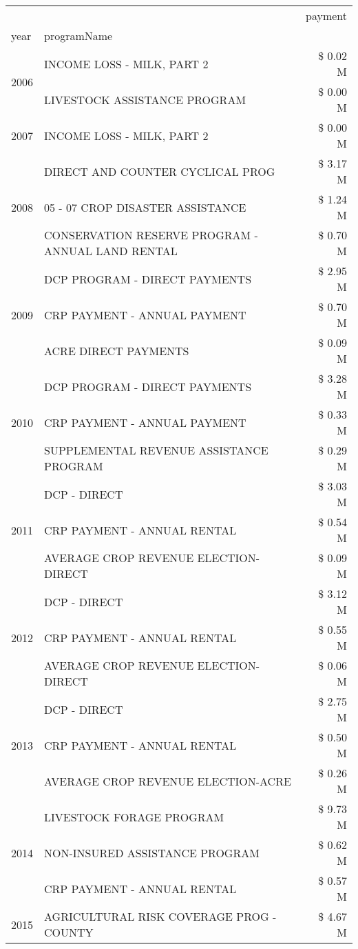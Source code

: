 \begin{tabular}{llr}
\toprule
 &  & payment \\
year & programName &  \\
\midrule
\multirow[t]{2}{*}{2006} & INCOME LOSS - MILK, PART 2 & \$ 0.02 M \\
 & LIVESTOCK ASSISTANCE PROGRAM & \$ 0.00 M \\
\cline{1-3}
2007 & INCOME LOSS - MILK, PART 2 & \$ 0.00 M \\
\cline{1-3}
\multirow[t]{3}{*}{2008} & DIRECT AND COUNTER CYCLICAL PROG & \$ 3.17 M \\
 & 05 - 07 CROP DISASTER ASSISTANCE & \$ 1.24 M \\
 & CONSERVATION RESERVE PROGRAM - ANNUAL LAND RENTAL & \$ 0.70 M \\
\cline{1-3}
\multirow[t]{3}{*}{2009} & DCP PROGRAM - DIRECT PAYMENTS & \$ 2.95 M \\
 & CRP PAYMENT - ANNUAL PAYMENT & \$ 0.70 M \\
 & ACRE DIRECT PAYMENTS & \$ 0.09 M \\
\cline{1-3}
\multirow[t]{3}{*}{2010} & DCP PROGRAM - DIRECT PAYMENTS & \$ 3.28 M \\
 & CRP PAYMENT - ANNUAL PAYMENT & \$ 0.33 M \\
 & SUPPLEMENTAL REVENUE ASSISTANCE PROGRAM & \$ 0.29 M \\
\cline{1-3}
\multirow[t]{3}{*}{2011} & DCP - DIRECT & \$ 3.03 M \\
 & CRP PAYMENT - ANNUAL RENTAL & \$ 0.54 M \\
 & AVERAGE CROP REVENUE ELECTION-DIRECT & \$ 0.09 M \\
\cline{1-3}
\multirow[t]{3}{*}{2012} & DCP - DIRECT & \$ 3.12 M \\
 & CRP PAYMENT - ANNUAL RENTAL & \$ 0.55 M \\
 & AVERAGE CROP REVENUE ELECTION-DIRECT & \$ 0.06 M \\
\cline{1-3}
\multirow[t]{3}{*}{2013} & DCP - DIRECT & \$ 2.75 M \\
 & CRP PAYMENT - ANNUAL RENTAL & \$ 0.50 M \\
 & AVERAGE CROP REVENUE ELECTION-ACRE & \$ 0.26 M \\
\cline{1-3}
\multirow[t]{3}{*}{2014} & LIVESTOCK FORAGE PROGRAM & \$ 9.73 M \\
 & NON-INSURED ASSISTANCE PROGRAM & \$ 0.62 M \\
 & CRP PAYMENT - ANNUAL RENTAL & \$ 0.57 M \\
\cline{1-3}
\multirow[t]{3}{*}{2015} & AGRICULTURAL RISK COVERAGE PROG - COUNTY & \$ 4.67 M \\

\end{tabular}
